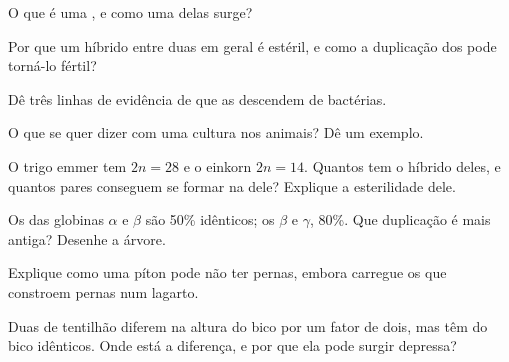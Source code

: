 \begin{exercise}[$\star$]\label{exo:g12:diversification-of-life:2}
O que é uma , e como uma delas surge?
\end{exercise}

\begin{exercise}[$\star$]\label{exo:g12:diversification-of-life:3}
Por que um híbrido entre duas  em geral é estéril, e como a
duplicação dos  pode torná-lo fértil?
\end{exercise}

\begin{exercise}[$\star$]\label{exo:g12:diversification-of-life:4}
Dê três linhas de evidência de que as  descendem de bactérias.
\end{exercise}

\begin{exercise}[$\star$]\label{exo:g12:diversification-of-life:5}
O que se quer dizer com uma cultura nos animais? Dê um exemplo.
\end{exercise}

\begin{exercise}[$\star\star$]\label{exo:g12:diversification-of-life:6}
O trigo emmer tem $2n = 28$ e o einkorn $2n = 14$. Quantos 
tem o híbrido deles, e quantos pares conseguem se formar na 
dele? Explique a esterilidade dele.
\end{exercise}

\begin{exercise}[$\star\star$]\label{exo:g12:diversification-of-life:7}
Os  das globinas $\alpha$ e $\beta$ são 50\% idênticos; os 
$\beta$ e $\gamma$, 80\%. Que duplicação é mais antiga? Desenhe a árvore.
\end{exercise}

\begin{exercise}[$\star\star$]\label{exo:g12:diversification-of-life:8}
Explique como uma píton pode não ter pernas, embora carregue os 
que constroem pernas num lagarto.
\end{exercise}

\begin{exercise}[$\star\star$]\label{exo:g12:diversification-of-life:9}
Duas  de tentilhão diferem na altura do bico por um fator de
dois, mas têm  do bico idênticos. Onde está a diferença, e por que
ela pode surgir depressa?
\end{exercise}

